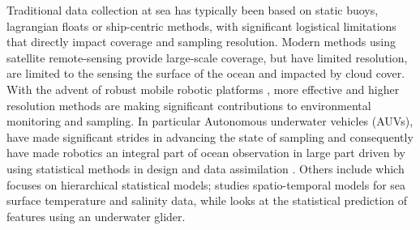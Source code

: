 \documentclass[aoas]{imsart}
\begin{document}
Traditional data collection at sea has typically been based on static
buoys, lagrangian floats or ship-centric methods, with significant
logistical limitations that directly impact coverage and sampling
resolution. Modern methods using satellite remote-sensing provide
large-scale coverage, but have limited resolution, are limited to the
sensing the surface of the ocean and impacted by cloud cover. With the
advent of robust mobile robotic platforms \cite{Bellingham07}, more
effective and higher resolution methods are making significant
contributions to environmental monitoring and sampling. 
In particular Autonomous underwater vehicles (AUVs), have made
significant strides in advancing the state of sampling
and consequently have made robotics an integral part of ocean
observation in large part driven by using 
statistical methods in design and data assimilation
\cite{das11b,Graham2013,Das2015,das15,fossuminformation,fossum18b}.%
Others include \cite{wikle2013modern} which %
focuses on hierarchical statistical models; \cite{sahu2008space} studies
spatio-temporal models for sea surface temperature and salinity data,
while
\cite{mellucci2018oceanic} looks at the statistical prediction of
features using an underwater glider.
\end{document}
